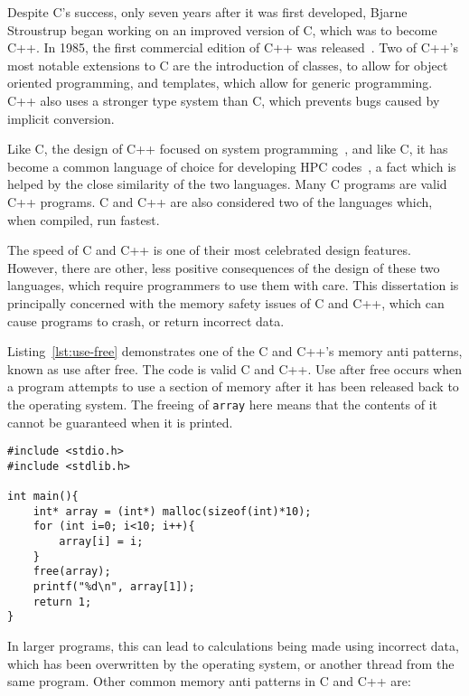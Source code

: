Despite C's success, only seven years after it was first developed, Bjarne Stroustrup began working on an improved version of C, which was to become C++. In 1985, the first commercial edition of C++ was released~\cite{CPPFAQS}. Two of C++'s most notable extensions to C are the introduction of classes, to allow for object oriented programming, and templates, which allow for generic programming. C++ also uses a stronger type system than C, which prevents bugs caused by implicit conversion.

Like C, the design of C++ focused on system programming~\cite{CplusEssence}, and like C, it has become a common language of choice for developing HPC codes~\cite{foam}, a fact which is helped by the close similarity of the two languages. Many C programs are valid C++ programs. C and C++ are also considered two of the languages which, when compiled, run fastest.

The speed of C and C++ is one of their most celebrated design features. However, there are other, less positive consequences of the design of these two languages, which require programmers to use them with care. This dissertation is principally concerned with the memory safety issues of C and C++, which can cause programs to crash, or return incorrect data.

Listing~\ref{lst:use-free} demonstrates one of the C and C++'s memory anti patterns, known as use after free. The code is valid C and C++. Use after free occurs when a program attempts to use a section of memory after it has been released back to the operating system.
The freeing of \texttt{array} here means that the contents of it cannot be guaranteed when it is printed.

\begin{code}
\begin{verbatim}
#include <stdio.h>
#include <stdlib.h>

int main(){
    int* array = (int*) malloc(sizeof(int)*10);
    for (int i=0; i<10; i++){
        array[i] = i;
    }
    free(array);
    printf("%d\n", array[1]);
    return 1;
}
\end{verbatim}
\label{lst:use-free}
\end{code}

In larger programs, this can lead to calculations being made using incorrect data, which has been overwritten by the operating system, or another thread from the same program. Other common memory anti patterns in C and C++ are:

